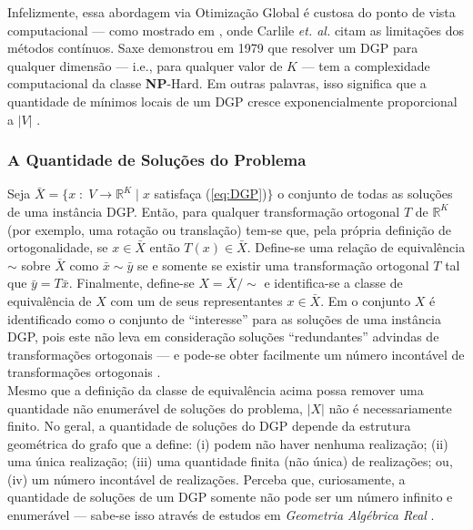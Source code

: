Infelizmente, essa abordagem via Otimização Global é custosa do ponto de vista computacional --- como mostrado em \cite{carlileRecentAdvancesMDGP}, onde Carlile \textit{et. al.} citam as limitações dos métodos contínuos. Saxe demonstrou em 1979 \cite{Saxe:79} que resolver um DGP para qualquer dimensão --- i.e., para qualquer valor de $K$ --- tem a complexidade computacional da classe \textbf{NP}-Hard. Em outras palavras, isso significa que a quantidade de mínimos locais de um DGP cresce exponencialmente proporcional a $|V|$ \cite{carlileIntroductionMDGP}. 

\subsubsection{A Quantidade de Soluções do Problema}

Seja $\bar{X} = \{x\; : \; V \rightarrow \mathbb{R}^K \; | \;x $ satisfaça (\ref{eq:DGP})$\}$ o conjunto de todas as soluções de uma instância DGP. Então, para qualquer transformação ortogonal $T$ de $\mathbb{R}^K$ (por exemplo, uma rotação ou translação) tem-se que, pela própria definição de ortogonalidade, se $x\in \bar{X}$ então $T(x) \in \bar{X}$. Define-se uma relação de equivalência $\sim$ sobre $\bar{X}$ como $\bar{x} \sim\bar{y}$ se e somente se existir uma transformação ortogonal $T$ tal que $\bar{y} = T\bar{x}$. Finalmente, define-se $X = \bar{X} /\sim$ e identifica-se a classe de equivalência de $X$ com um de seus representantes $x\in \bar{X}$. Em \cite{carlileRecentAdvancesMDGP} o conjunto $X$ é identificado como o conjunto de ``interesse'' para as soluções de uma instância DGP, pois este não leva em consideração soluções ``redundantes'' advindas de transformações ortogonais  --- e pode-se obter facilmente um número incontável de transformações ortogonais \cite{libertiMdgpContinousToDiscrete}.
\\

Mesmo que a definição da classe de equivalência acima possa remover uma quantidade não enumerável de soluções do problema, $|X|$ não é necessariamente finito. No geral, a quantidade de soluções do DGP depende da estrutura geométrica do grafo que a define: (i) podem não haver nenhuma realização; (ii) uma única realização; (iii) uma quantidade finita (não única) de realizações; ou, (iv) um número incontável de realizações. Perceba que, curiosamente, a quantidade de soluções de um DGP somente não pode ser um número infinito e enumerável --- sabe-se isso através de estudos em \textit{Geometria Algébrica Real} \cite{benedettireal}.\\
 
